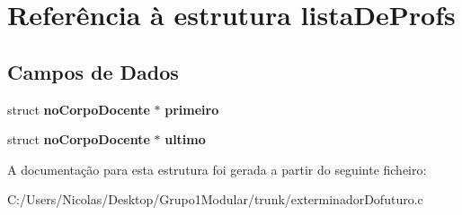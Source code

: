 \section{Referência à estrutura lista\+De\+Profs}
\label{structlista_de_profs}
\subsection*{Campos de Dados}
\begin{DoxyCompactItemize}
\item 
\mbox{\label{structlista_de_profs_ab067d22462dc6c6d6a084873ec3aa48c}} 
struct \textbf{ no\+Corpo\+Docente} $\ast$ {\bfseries primeiro}
\item 
\mbox{\label{structlista_de_profs_a686d7ea321cd0f986707ee4f9777ac97}} 
struct \textbf{ no\+Corpo\+Docente} $\ast$ {\bfseries ultimo}
\end{DoxyCompactItemize}


A documentação para esta estrutura foi gerada a partir do seguinte ficheiro\+:\begin{DoxyCompactItemize}
\item 
C\+:/\+Users/\+Nicolas/\+Desktop/\+Grupo1\+Modular/trunk/exterminador\+Dofuturo.\+c\end{DoxyCompactItemize}
